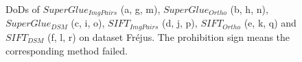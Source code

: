 \begin{figure}[htbp]
\begin{center}
        \caption{{\scriptsize DoDs of $SuperGlue_{ImgPairs}$ (a, g, m), $SuperGlue_{Ortho}$ (b, h, n), $SuperGlue_{DSM}$ (c, i, o), $SIFT_{ImgPairs}$ (d, j, p), $SIFT_{Ortho}$ (e, k, q) and $SIFT_{DSM}$ (f, l, r) on dataset Fr{\'e}jus. The prohibition sign means the corresponding method failed.}}
        \label{DoDFrejus}
    \end{center}
\end{figure} 



